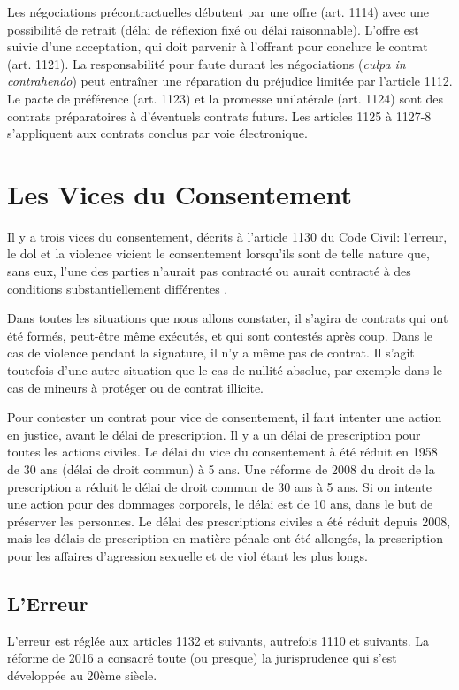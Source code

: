 \documentclass[math]{cours}
\begin{document}
Les négociations précontractuelles débutent par une offre (art. 1114) avec une possibilité de retrait (délai de réflexion fixé ou délai raisonnable). L'offre est suivie d'une acceptation, qui doit parvenir à l'offrant pour conclure le contrat (art. 1121). La responsabilité pour faute durant les négociations (\emph{culpa in contrahendo}) peut entraîner une réparation du préjudice limitée par l'article 1112.
Le pacte de préférence (art. 1123) et la promesse unilatérale (art. 1124) sont des contrats préparatoires à d'éventuels contrats futurs. Les articles 1125 à 1127-8 s'appliquent aux contrats conclus par voie électronique.

\section{Les Vices du Consentement}
Il y a trois vices du consentement, décrits à l'article 1130 du Code Civil: \og l'erreur, le dol et la violence vicient le consentement lorsqu'ils sont de telle nature que, sans eux, l'une des parties n'aurait pas contracté ou aurait contracté à des conditions substantiellement différentes \fg.

Dans toutes les situations que nous allons constater, il s'agira de contrats qui ont été formés, peut-être même exécutés, et qui sont contestés après coup.
Dans le cas de violence pendant la signature, il n'y a même pas de contrat. Il s'agit toutefois d'une autre situation que le cas de nullité absolue, par exemple dans le cas de mineurs à protéger ou de contrat illicite.

Pour contester un contrat pour vice de consentement, il faut intenter une action en justice, avant le délai de prescription.
Il y a un délai de prescription pour toutes les actions civiles.
Le délai du vice du consentement à été réduit en 1958 de 30 ans (délai de droit commun) à 5 ans.
Une réforme de 2008 du droit de la prescription a réduit le délai de droit commun de 30 ans à 5 ans.
Si on intente une action pour des dommages corporels, le délai est de 10 ans, dans le but de préserver les personnes.
Le délai des prescriptions civiles a été réduit depuis 2008, mais les délais de prescription en matière pénale ont été allongés, la prescription pour les affaires d'agression sexuelle et de viol étant les plus longs.

\subsection{L'Erreur}
L'erreur est réglée aux articles 1132 et suivants, autrefois 1110 et suivants.
La réforme de 2016 a consacré toute (ou presque) la jurisprudence qui s'est développée au 20ème siècle.
\end{document}
